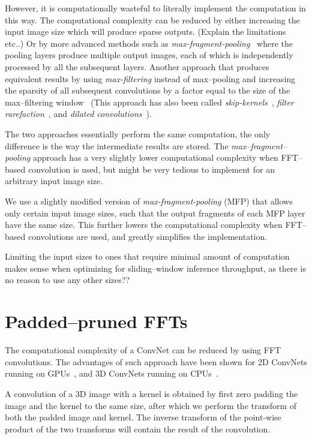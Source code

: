 \documentclass[conference]{IEEEtran}
\begin{document}
  However, it is computationally wasteful to literally implement the
  computation in this way.  The computational complexity can be
  reduced by either increasing the input image size which will produce
  sparse outputs. (Explain the limitations etc..) Or by more advanced
  methods such as
  \emph{max-fragment-pooling}~\cite{giusti2013fast,masci2013fast}
  where the pooling layers produce multiple output images, each of
  which is independently processed by all the subsequent layers.
  Another approach that produces equivalent results by using
  \emph{max-filtering} instead of max--pooling and increasing the
  sparsity of all subsequent convolutions by a factor equal to the
  size of the max--filtering window~\cite{zlateski2015znn} (This
  approach has also been called
  \emph{skip-kernels}~\cite{sermanet2013overfeat}, \emph{filter
    rarefaction}~\cite{long2015fully}, and \emph{dilated
    convolutions}~\cite{yu2015multi}).

  The two approaches essentially perform the same computation, the
  only difference is the way the intermediate results are stored.  The
  \emph{max--fragment--pooling} approach has a very slightly
  lower computational complexity when FFT--based convolution is used,
  but might be very tedious to implement for an arbitrary input image
  size.

  We use a slightly modified version of
  \emph{max-fragment-pooling} (MFP) that allows only certain
  input image sizes, such that the output fragments of each MFP layer
  have the same size.  This further lowers the computational
  complexity when FFT--based convolutions are used, and greatly
  simplifies the implementation.

  Limiting the input sizes to ones that require minimal amount of
  computation makes sense when optimizing for sliding--window
  inference throughput, as there is no reason to use any other sizes??

\section{Padded--pruned FFTs}

  The computational complexity of a ConvNet can be reduced by using
  FFT convolutions.  The advantages of such approach have been shown
  for 2D ConvNets running on
  GPUs~\cite{mathieu-iclr-14,vasilache2014fast}, and 3D ConvNets
  running on CPUs~\cite{zlateski2015znn}.

  A convolution of a 3D image with a kernel is obtained by first zero
  padding the image and the kernel to the same size, after which we
  perform the transform of both the padded image and kernel.  The
  inverse transform of the point-wise product of the two transforms
  will contain the result of the convolution.
\end{document}
